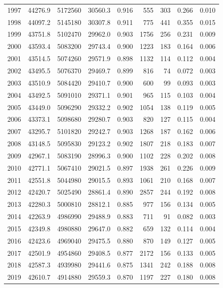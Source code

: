 \documentclass[
]{scrartcl}
\begin{document}
\begin{table}
{\begin{tabular*}{\linewidth}{@{\extracolsep{\fill}}rrrrrrrrr}
1997 & 44276.9 & 5172560 & 30560.3 & 0.916 & 555 & 303 & 0.266 & 0.010 \\ 
1998 & 44097.2 & 5145180 & 30307.8 & 0.911 & 775 & 441 & 0.355 & 0.015 \\ 
1999 & 43751.8 & 5102470 & 29962.0 & 0.903 & 1756 & 256 & 0.231 & 0.009 \\ 
2000 & 43593.4 & 5083200 & 29743.4 & 0.900 & 1223 & 183 & 0.164 & 0.006 \\ 
2001 & 43514.5 & 5074260 & 29571.9 & 0.898 & 1132 & 114 & 0.112 & 0.004 \\ 
2002 & 43495.5 & 5076370 & 29469.7 & 0.899 & 816 & 74 & 0.072 & 0.003 \\ 
2003 & 43510.9 & 5084420 & 29410.7 & 0.900 & 600 & 99 & 0.093 & 0.003 \\ 
2004 & 43492.5 & 5091010 & 29371.1 & 0.901 & 965 & 115 & 0.103 & 0.004 \\ 
2005 & 43449.0 & 5096290 & 29332.2 & 0.902 & 1054 & 138 & 0.119 & 0.005 \\ 
2006 & 43373.1 & 5098680 & 29280.7 & 0.903 & 820 & 127 & 0.115 & 0.004 \\ 
2007 & 43295.7 & 5101820 & 29242.7 & 0.903 & 1268 & 187 & 0.162 & 0.006 \\ 
2008 & 43148.5 & 5095830 & 29123.2 & 0.902 & 1807 & 218 & 0.183 & 0.007 \\ 
2009 & 42967.1 & 5083190 & 28996.3 & 0.900 & 1102 & 228 & 0.202 & 0.008 \\ 
2010 & 42771.1 & 5067410 & 29021.5 & 0.897 & 1938 & 261 & 0.226 & 0.009 \\ 
2011 & 42551.8 & 5044980 & 29015.5 & 0.893 & 1061 & 210 & 0.168 & 0.007 \\ 
2012 & 42420.7 & 5025490 & 28861.4 & 0.890 & 2857 & 244 & 0.192 & 0.008 \\ 
2013 & 42280.3 & 5000810 & 28812.1 & 0.885 & 977 & 156 & 0.134 & 0.005 \\ 
2014 & 42263.9 & 4986990 & 29488.9 & 0.883 & 711 & 91 & 0.082 & 0.003 \\ 
2015 & 42349.8 & 4980880 & 29647.0 & 0.882 & 659 & 132 & 0.114 & 0.004 \\ 
2016 & 42423.6 & 4969040 & 29475.5 & 0.880 & 870 & 149 & 0.127 & 0.005 \\ 
2017 & 42501.9 & 4954860 & 29408.5 & 0.877 & 2172 & 156 & 0.133 & 0.005 \\ 
2018 & 42587.3 & 4939980 & 29441.6 & 0.875 & 1341 & 242 & 0.188 & 0.008 \\ 
2019 & 42610.7 & 4914880 & 29559.3 & 0.870 & 1197 & 227 & 0.180 & 0.008 \\ 

\end{tabular*}}
\end{table}
\end{document}
